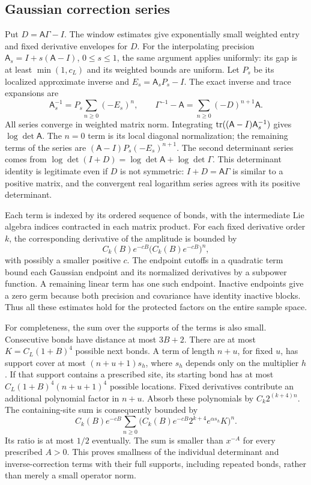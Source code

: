 \subsection{Gaussian correction series}

Put $D=\mathsf A\Gamma-I$. The window estimates give exponentially small
weighted entry and fixed derivative envelopes for $D$. For the
interpolating precision $\mathsf A_s=I+s(\mathsf A-I)$, $0\le s\le1$,
the same argument applies uniformly: its gap is at least
$\min(1,c_L)$ and its weighted bounds are uniform.
Let $P_s$ be its localized approximate inverse and $E_s=\mathsf A_sP_s-I$.
The exact inverse and trace expansions are
\[
 \mathsf A_s^{-1}=P_s\sum_{n\ge0}(-E_s)^n,\qquad
 \Gamma^{-1}-\mathsf A=\sum_{n\ge0}(-D)^{n+1}\mathsf A .
\]
All series converge in weighted matrix norm. Integrating
$\operatorname{tr}((\mathsf A-I)\mathsf A_s^{-1})$ gives $\log\det\mathsf A$.
The $n=0$ term is its local diagonal normalization; the remaining terms of the series
are $(\mathsf A-I)P_s(-E_s)^{n+1}$.
The second determinant series comes from
$\log\det(I+D)=\log\det\mathsf A+\log\det\Gamma$.
This determinant identity is legitimate even if $D$ is not symmetric:
$I+D=\mathsf A\Gamma$ is similar to a positive matrix, and the
convergent real logarithm series agrees with its positive determinant.

Each term is indexed by its ordered sequence of bonds, with the intermediate Lie algebra indices contracted in each matrix product. For each fixed derivative order $k$,
the corresponding derivative of the amplitude is bounded by
\[
 C_k(B)e^{-cB}\bigl(C_k(B)e^{-cB}\bigr)^n,
\]
with possibly a smaller positive $c$. The endpoint cutoffs in a quadratic term
bound each Gaussian endpoint and its normalized derivatives by
a subpower function. A remaining linear term has one such endpoint.
Inactive endpoints give a zero germ because both precision and
covariance have identity inactive blocks. Thus all these estimates hold
for the protected factors on the entire sample space.

For completeness, the sum over the supports of the terms is also small.
Consecutive bonds have distance at most $3B+2$.
There are at most $K=C_L(1+B)^4$ possible next bonds.
A term of length $n+u$, for fixed $u$, has support cover at most
$(n+u+1)s_h$, where $s_h$ depends only on the multiplier $h$.
If that support contains a prescribed site, its starting bond has
at most $C_L(1+B)^4(n+u+1)^4$ possible locations.
Fixed derivatives contribute an additional polynomial factor in $n+u$.
Absorb these polynomials by $C_k2^{(k+4)n}$. The containing-site sum
is consequently bounded by
\[
 C_k(B)e^{-cB}\sum_{n\ge0}
 \bigl(C_k(B)e^{-cB}2^{k+4}
                e^{\alpha s_h}K\bigr)^{n}.
\]
Its ratio is at most $1/2$ eventually. The sum is smaller than
$x^{-A}$ for every prescribed $A>0$. This proves smallness of the
individual determinant and inverse-correction terms with their full
supports, including repeated bonds, rather than merely a small
operator norm.

